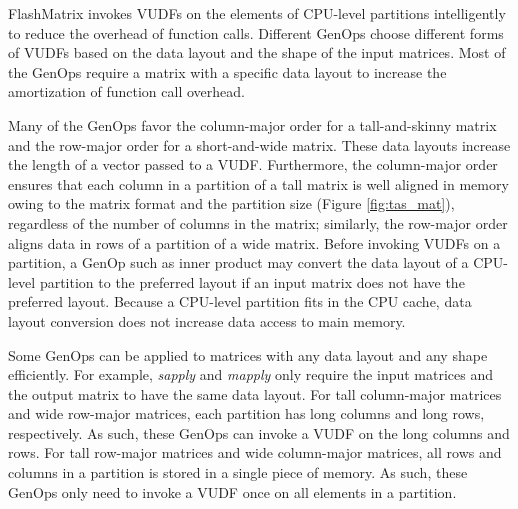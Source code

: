 FlashMatrix invokes VUDFs on the elements of CPU-level partitions intelligently
to reduce the overhead of function
calls. Different GenOps choose different forms of VUDFs based on the data layout
and the shape of the input matrices. Most of the GenOps require a matrix with
a specific data layout to increase the amortization of function call overhead.

Many of the GenOps favor the column-major order for a tall-and-skinny matrix
and the row-major order for a short-and-wide matrix. These data layouts increase
the length of a vector passed to a VUDF. Furthermore, the column-major order
ensures that each column in a partition of a tall matrix is well aligned in memory
owing to the matrix
format and the partition size (Figure \ref{fig:tas_mat}), regardless of the number
of columns in the matrix; similarly, the row-major order aligns data in rows of
a partition of a wide matrix. Before invoking VUDFs on a partition, a GenOp
such as inner product may convert the data layout of a CPU-level partition to
the preferred layout if an input matrix does not have the preferred layout.
Because a CPU-level partition fits in the CPU cache, data layout conversion
does not increase data access to main memory. 

Some GenOps can be applied to matrices with any data layout and any shape
efficiently. For example, \textit{sapply} and \textit{mapply} only require
the input matrices and the output matrix to have the same data layout. For tall
column-major matrices and wide row-major matrices, each partition has long
columns and long rows, respectively. As such, these GenOps can invoke a VUDF
on the long columns and rows. For tall row-major matrices and wide column-major
matrices, all rows and columns in a partition is stored in a single piece of
memory. As such, these GenOps only need to invoke a VUDF once on all elements
in a partition. %

